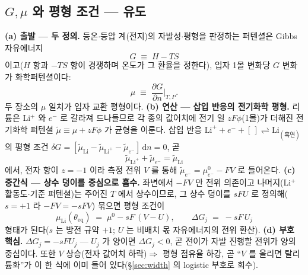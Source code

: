\documentclass[11pt,a4paper]{article}
\newcommand{\dd}{\mathrm{d}}
\newcommand{\eq}{\mathrm{eq}}
\begin{document}
\subsection{$G,\mu$ 와 평형 조건 — 유도}
\textbf{(a) 출발 — 두 정의.} 등온$\cdot$등압 계(전지)의 자발성$\cdot$평형을 판정하는 퍼텐셜은 Gibbs 자유에너지
\begin{equation}
G\;\equiv\;H-TS
\label{eq:gibbsdef}
\end{equation}
이고($H$ 항과 $-TS$ 항이 경쟁하며 온도가 그 환율을 정한다), 입자 1몰 변화당 $G$ 변화가 화학퍼텐셜이다:
\begin{equation}
\mu\;\equiv\;\frac{\partial G}{\partial n}\Big|_{T,P}.
\label{eq:mudef}
\end{equation}
두 장소의 $\mu$ 일치가 입자 교환 평형이다. \textbf{(b) 연산 — 삽입 반응의 전기화학 평형.} 리튬은 Li$^+$ 와 $e^-$ 로
갈라져 드나들므로 각 종의 값어치에 전기 일 $zF\phi$(1몰)가 더해진 전기화학 퍼텐셜 $\tilde\mu\equiv\mu+zF\phi$ 가 균형을
이룬다. 삽입 반응 $\mathrm{Li}^++e^-+[\,]\rightleftharpoons\mathrm{Li}_{(\text{흑연})}$ 의 평형 조건
$\delta G=[\tilde\mu_\mathrm{Li}-\tilde\mu_{\mathrm{Li}^+}-\tilde\mu_{e^-}]\,\dd n=0$, 곧
\begin{equation}
\tilde\mu_{\mathrm{Li}^+}+\tilde\mu_{e^-}=\tilde\mu_\mathrm{Li}
\label{eq:eqbalance}
\end{equation}
에서, 전자 항이 $z=-1$ 이라 측정 전위 $V$ 를 통해 $\tilde\mu_{e^-}=\mu_{e^-}^0-FV$ 로 들어온다. \textbf{(c) 중간식 —
상수 덩이를 중심으로 흡수.} 좌변에서 $-FV$ 만 전위 의존이고 나머지(Li$^+$ 활동도$\cdot$기준 퍼텐셜)는 주어진 $T$ 에서
상수이므로, 그 상수 덩이를 $sFU$ 로 정의해($s=+1$ 라 $-FV=-sFV$) 묶으면 평형 조건이
\begin{equation}
\mu_\mathrm{Li}(\theta_\eq)\;=\;\mu^0-sF\,(V-U),
\qquad \Delta G_j\;=\;-sF\,U_j
\label{eq:eqcond}
\end{equation}
형태가 된다($s$ 는 방전 규약 $+1$; $U$ 는 비배치 몫 자유에너지의 전위 환산). \textbf{(d) 부호 핵심.} $\Delta G_j=-sFU_j$ —
$U_j$ 가 양이면 $\Delta G_j<0$, 곧 전이가 자발 진행할 전위가 양의 중심이다. 또한 $V$ 상승(전자 값어치 하락)$\Rightarrow$
평형 점유율 하강, 곧 ``$V$ 를 올리면 탈리튬화''가 이 한 식에 이미 들어 있다(\S\ref{sec:width} 의 logistic 부호로 회수).
\end{document}

